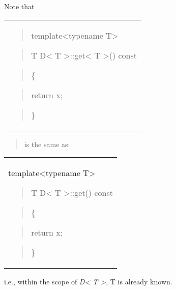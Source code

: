\documentclass[
]{article}
\begin{document}
Note that

\begin{longtable}[]{@{}
  >{\raggedright\arraybackslash}p{}@{}}
\toprule\noalign{}
 \\
\midrule\noalign{}
\endhead
\bottomrule\noalign{}
\endlastfoot
\begin{quote}
template\textless typename T\textgreater{}
\end{quote}

\begin{quote}
T D\textless{} T \textgreater::get\textless{} T \textgreater() const
\end{quote}

\begin{quote}
\{
\end{quote}

\begin{quote}
return x;
\end{quote}

\begin{quote}
\}
\end{quote} \\
\end{longtable}

\begin{quote}
is the same as:
\end{quote}

\begin{longtable}[]{@{}
  >{\raggedright\arraybackslash}p{}@{}}
\toprule\noalign{}
 \\
\midrule\noalign{}
\endhead
\bottomrule\noalign{}
\endlastfoot
template\textless typename T\textgreater{}

\begin{quote}
T D\textless{} T \textgreater::get() const
\end{quote}

\begin{quote}
\{
\end{quote}

\begin{quote}
return x;
\end{quote}

\begin{quote}
\}
\end{quote} \\
\end{longtable}

i.e., within the scope of \emph{D\textless{} T \textgreater{}}, T is
already known.
\end{document}
